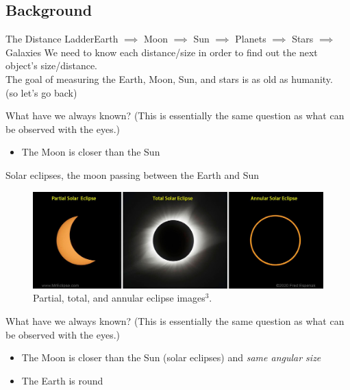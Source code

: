 \documentclass[12pt]{beamer}
\begin{document}
    \subsection{Background}
        \begin{frame}{The Distance Ladder}{Earth $\implies$ Moon $\implies$ Sun $\implies$ Planets $\implies$ Stars $\implies$ Galaxies} \centering
            \pause
            We need to know each distance/size in order to find out the next object's size/distance.\\
            \pause
            The goal of measuring the Earth, Moon, Sun, and stars is as old as humanity.\\ \vspace{2em}
            \small (so let's go back)
        \end{frame}
        \begin{frame}{What have we always known?} \centering
            (This is essentially the same question as what can be observed with the eyes.)
            \pause
            \begin{itemize}
                \item<2-> The Moon is closer than the Sun
            \end{itemize}
        \end{frame}
        \begin{frame} \centering
            Solar eclipses, the moon passing between the Earth and Sun
            \begin{figure}
                \includegraphics[scale=0.17, fbox]{eclipse.jpg}
            \caption{Partial, total, and annular eclipse images$^3$.}
            \end{figure}
        \end{frame}
        \begin{frame}{What have we always known?} \centering
            (This is essentially the same question as what can be observed with the eyes.)
            \begin{itemize}
                \item The Moon is closer than the Sun (solar eclipses) and \textit{same angular size}
                \item The Earth is round
            \end{itemize}
        \end{frame}
\end{document}
